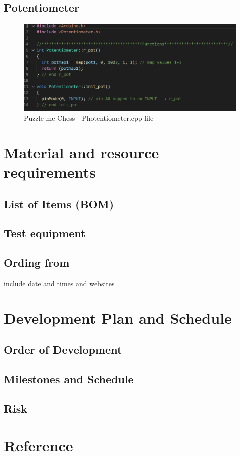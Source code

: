 \documentclass[11pt]{article}
\begin{document}
\subsection{Potentiometer}

\begin{figure}
  \includegraphics[width=\linewidth]{./Pics/Potentiometercpp.PNG}
  \caption{Puzzle me Chess - Photentiometer.cpp file}
  \label{fig:Photentiometer}
\end{figure}

\section{Material and resource requirements}
\subsection{List of Items (BOM)}
\subsection{Test equipment}
\subsection{Ording from}
include date and times and websites

\section{Development Plan and Schedule}
\subsection{Order of Development}
\subsection{Milestones and Schedule}
\subsection{Risk}

\section{Reference}
\end{document}
